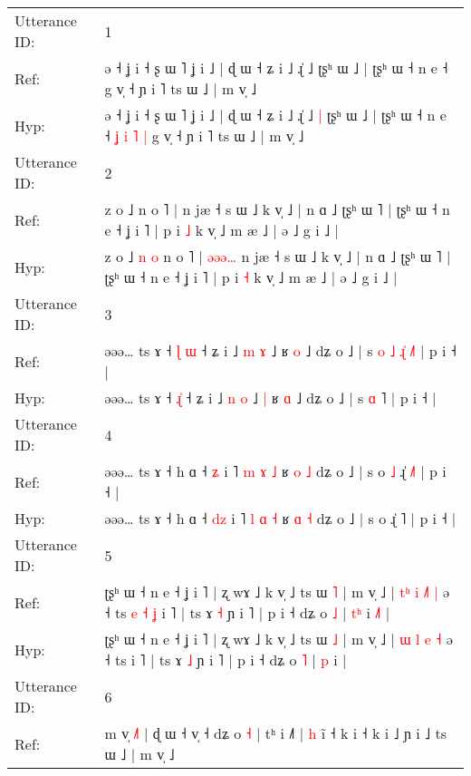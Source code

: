 \documentclass[10pt]{article}
\DeclareRobustCommand{\hl}[1]{{\textcolor{red}{#1}}}
\begin{document}
\begin{longtable}{ll}
\toprule
Utterance ID: & 1 \\
Ref: & ə ˧ ʝ i ˧ ʂ ɯ ˥ ʝ i ˩ | ɖ ɯ ˧ ʑ i ˩ ɻ̍ ˩\hl{}\hl{} ʈʂʰ ɯ ˩ | ʈʂʰ ɯ ˧ n e ˧\hl{}\hl{}\hl{}\hl{}\hl{}\hl{}\hl{}\hl{} g v̩ ˧ ɲ i ˥ ts ɯ ˩ | m v̩ ˩
 \\
Hyp: & ə ˧ ʝ i ˧ ʂ ɯ ˥ ʝ i ˩ | ɖ ɯ ˧ ʑ i ˩ ɻ̍ ˩\hl{ }\hl{|} ʈʂʰ ɯ ˩ | ʈʂʰ ɯ ˧ n e ˧\hl{ }\hl{ʝ}\hl{ }\hl{i}\hl{ }\hl{˥}\hl{ }\hl{|} g v̩ ˧ ɲ i ˥ ts ɯ ˩ | m v̩ ˩
 \\
\midrule
Utterance ID: & 2 \\
Ref: & z o ˩\hl{}\hl{}\hl{}\hl{} n o ˥ |\hl{}\hl{}\hl{}\hl{}\hl{} n jæ ˧ s ɯ ˩ k v̩ ˩ | n ɑ ˩ ʈʂʰ ɯ ˥ | ʈʂʰ ɯ ˧ n e ˧ ʝ i ˥ | p i \hl{˩} k v̩ ˩ m æ ˩ | ə ˩ g i ˩ |
 \\
Hyp: & z o ˩\hl{ }\hl{n}\hl{ }\hl{o} n o ˥ |\hl{ }\hl{ə}\hl{ə}\hl{ə}\hl{…} n jæ ˧ s ɯ ˩ k v̩ ˩ | n ɑ ˩ ʈʂʰ ɯ ˥ | ʈʂʰ ɯ ˧ n e ˧ ʝ i ˥ | p i \hl{˧} k v̩ ˩ m æ ˩ | ə ˩ g i ˩ |
 \\
\midrule
Utterance ID: & 3 \\
Ref: & əəə… ts ɤ ˧ \hl{ɭ}\hl{ }\hl{ɯ} ˧ ʑ i ˩ \hl{m} \hl{ɤ} ˩\hl{}\hl{} ʁ \hl{o} ˩ dʑ o ˩ | s\hl{ }\hl{o}\hl{ }\hl{˩} \hl{ɻ}\hl{̍} \hl{˩}˥ | p i ˧ |
 \\
Hyp: & əəə… ts ɤ ˧ \hl{}\hl{ɻ}\hl{̍} ˧ ʑ i ˩ \hl{n} \hl{o} ˩\hl{ }\hl{|} ʁ \hl{ɑ} ˩ dʑ o ˩ | s\hl{}\hl{}\hl{}\hl{} \hl{}\hl{ɑ} \hl{}˥ | p i ˧ |
 \\
\midrule
Utterance ID: & 4 \\
Ref: & əəə… ts ɤ ˧ h ɑ ˧ \hl{}\hl{ʑ} i ˥ \hl{m} \hl{ɤ} \hl{˩} ʁ \hl{o} \hl{˩} dʑ o ˩ | s o\hl{ }\hl{˩} ɻ̍ \hl{˩}˥ | p i ˧ |
 \\
Hyp: & əəə… ts ɤ ˧ h ɑ ˧ \hl{d}\hl{z} i ˥ \hl{l} \hl{ɑ} \hl{˧} ʁ \hl{ɑ} \hl{˧} dʑ o ˩ | s o\hl{}\hl{} ɻ̍ \hl{}˥ | p i ˧ |
 \\
\midrule
Utterance ID: & 5 \\
Ref: & ʈʂʰ ɯ ˧ n e ˧ ʝ i ˥ | ʐ wɤ ˩ k v̩ ˩ ts ɯ \hl{˥} | m v̩ ˩ | \hl{t}\hl{ʰ} \hl{i} \hl{˩}\hl{˥} \hl{|} ə ˧ ts\hl{ }\hl{e}\hl{ }\hl{˧}\hl{ }\hl{ʝ} i ˥ | ts ɤ \hl{˧} ɲ i ˥ | p i ˧ dʑ o \hl{˩} | \hl{t}\hl{ʰ} i\hl{ }\hl{˩}\hl{˥} |
 \\
Hyp: & ʈʂʰ ɯ ˧ n e ˧ ʝ i ˥ | ʐ wɤ ˩ k v̩ ˩ ts ɯ \hl{˩} | m v̩ ˩ | \hl{}\hl{ɯ} \hl{l} \hl{}\hl{e} \hl{˧} ə ˧ ts\hl{}\hl{}\hl{}\hl{}\hl{}\hl{} i ˥ | ts ɤ \hl{˩} ɲ i ˥ | p i ˧ dʑ o \hl{˥} | \hl{}\hl{p} i\hl{}\hl{}\hl{} |
 \\
\midrule
Utterance ID: & 6 \\
Ref: & m v̩ \hl{˩}\hl{˥} | ɖ ɯ ˧ v̩ ˧ dʑ o \hl{˧} | tʰ i ˩˥ |\hl{ }\hl{h} i\hl{̃} ˧ k i ˧ k i ˩ ɲ i ˩ ts ɯ ˩ | m v̩ ˩

\end{longtable}
\end{document}
